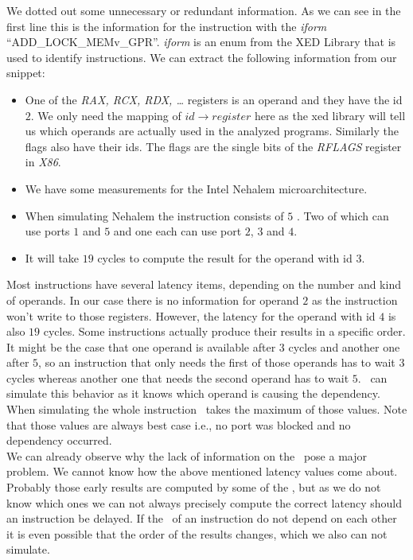 We dotted out some unnecessary or redundant information. As we can see in the first line this is the information for the instruction with the \emph{iform} ``ADD\_LOCK\_MEMv\_GPR''. \emph{iform} is an enum from the XED Library \cite{xed} that is used to identify instructions. We can extract the following information from our snippet:

\begin{itemize}
    \item One of the \emph{RAX, RCX, RDX, \dots} registers is an operand and they have the id $2$. We only need the mapping of $id \rightarrow register$ here as the xed library will tell us which operands are actually used in the analyzed programs. Similarly the flags also have their ids. The flags are the single bits of the \emph{RFLAGS} register in \emph{X86}.
    \item We have some measurements for the Intel Nehalem microarchitecture.
    \item When simulating Nehalem the instruction consists of $5$ \microops. Two of which can use ports $1$ and $5$ and one each can use port $2$, $3$ and $4$.
    \item It will take $19$ cycles to compute the result for the operand with id $3$.
\end{itemize}

Most instructions have several latency items, depending on the number and kind of operands. In our case there is no information for operand $2$ as the instruction won't write to those registers. However, the latency for the operand with id $4$ is also $19$ cycles. Some instructions actually produce their results in a specific order. It might be the case that one operand is available after $3$ cycles and another one after $5$, so an instruction that only needs the first of those operands has to wait $3$ cycles whereas another one that needs the second operand has to wait $5$. \suaca\ can simulate this behavior as it knows which operand is causing the dependency. When simulating the whole instruction \suaca\ takes the maximum of those values. Note that those values are always best case i.e., no port was blocked and no dependency occurred.\\
We can already observe why the lack of information on the \microops\ pose a major problem. We cannot know how the above mentioned latency values come about. Probably those early results are computed by some of the \microops, but as we do not know which ones we can not always precisely compute the correct latency should an instruction be delayed. If the \microops\ of an instruction do not depend on each other it is even possible that the order of the results changes, which we also can not simulate.

